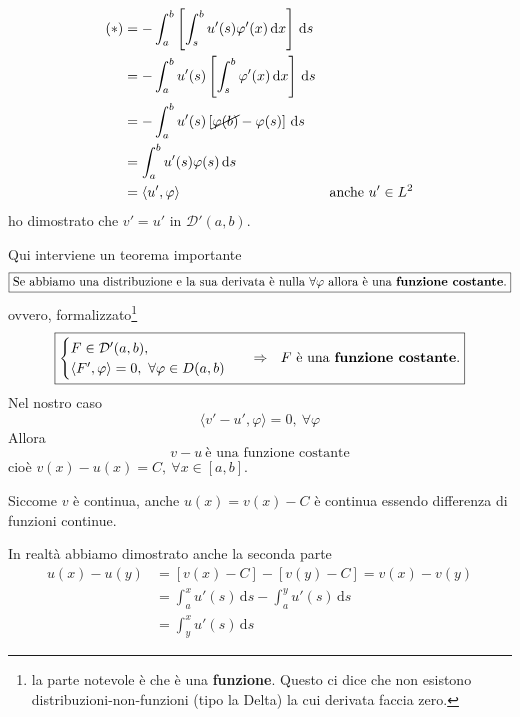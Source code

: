 \documentclass[10pt,a4paper,twoside,openright]{book}
\newcommand{\de}{\,\mathrm d}
\newcommand{\dx}{\de x}
\newcommand{\ds}{\de s}
\begin{document}
\begin{dimostrazione}
    \begin{align*}
        (*) & =-\int ^{b}_{a}\left[\int ^{b}_{s} u'(s) \varphi '(x) \dx\right] \ds    &                            \\
            & =-\int ^{b}_{a} u'(s)\left[\int ^{b}_{s} \varphi '(x) \dx\right] \ds    &                            \\
            & =-\int ^{b}_{a} u'(s)\left[\cancel{\varphi (b)} -\varphi (s)\right] \ds &                            \\
            & =\int ^{b}_{a} u'(s) \varphi (s) \ds                                    &                            \\
            & =\langle u',\varphi \rangle                                             & \text{anche} \ u'\in L^{2}
    \end{align*}
    ho dimostrato che $v'=u'$ in $\mathcal{D} '(a,b)$.

    Qui interviene un teorema importante
    \begin{equation*}
        \boxed{\text{Se abbiamo una distribuzione e la sua derivata è nulla} \ \forall \varphi \ \text{allora è una \textbf{funzione costante}.}}
    \end{equation*}
    ovvero, formalizzato\footnote{la parte notevole è che è una \textbf{funzione}. Questo ci dice che non esistono distribuzioni-non-funzioni (tipo la Delta) la cui derivata faccia zero.}
    \begin{equation*}
        \boxed{
            \begin{cases}
                F\in \mathcal{D} '(a,b) , \\
                \langle F',\varphi \rangle =0,\ \forall \varphi \in D(a,b)
            \end{cases} \ \ \Rightarrow \ \ F\ \text{è una \textbf{funzione costante}.}}
    \end{equation*}
    Nel nostro caso
    \begin{equation*}
        \langle v'-u',\varphi \rangle =0,\ \forall \varphi
    \end{equation*}
    Allora
    \begin{equation*}
        v-u\ \text{è una funzione costante}
    \end{equation*}
    cioè $v(x) -u(x) =C,\ \forall x\in [ a,b]$.

    Siccome $v$ è continua, anche $u(x) =v(x) -C$ è continua essendo differenza di funzioni continue.

    In realtà abbiamo dimostrato anche la seconda parte
    \begin{align*}
        u(x) -u(y) & =[ v(x) -C] -[ v(y) -C] =v(x) -v(y)              \\
                   & =\int ^{x}_{a} u'(s) \ds-\int ^{y}_{a} u'(s) \ds \\
                   & =\int ^{x}_{y} u'(s) \ds
    \end{align*}
\end{dimostrazione}
\end{document}

